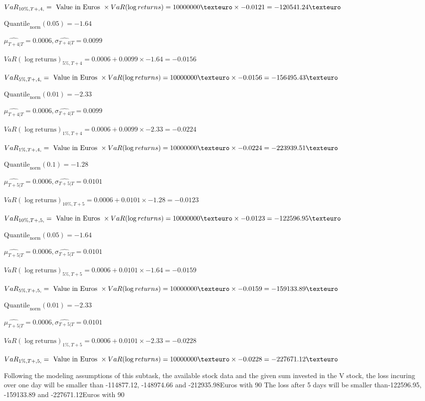 $VaR_{10\%, T + ,4,} = \text{ Value in Euros } \times VaR(\log returns) = 10 000 000 \texteuro \times-0.0121 = -120541.24 \texteuro$


$\text{Quantile}_\text{norm}(0.05) = -1.64$

$\hat{\mu_{T+4|T}} = 0.0006, \hat{\sigma_{T+4|T}} = 0.0099$

$VaR(\log \text{returns})_{5\%, T + 4} = 0.0006 + 0.0099\times-1.64 = -0.0156$

$VaR_{5\%, T + ,4,} = \text{ Value in Euros } \times VaR(\log returns) = 10 000 000 \texteuro \times-0.0156 = -156495.43 \texteuro$


$\text{Quantile}_\text{norm}(0.01) = -2.33$

$\hat{\mu_{T+4|T}} = 0.0006, \hat{\sigma_{T+4|T}} = 0.0099$

$VaR(\log \text{returns})_{1\%, T + 4} = 0.0006 + 0.0099\times-2.33 = -0.0224$

$VaR_{1\%, T + ,4,} = \text{ Value in Euros } \times VaR(\log returns) = 10 000 000 \texteuro \times-0.0224 = -223939.51 \texteuro$


$\text{Quantile}_\text{norm}(0.1) = -1.28$

$\hat{\mu_{T+5|T}} = 0.0006, \hat{\sigma_{T+5|T}} = 0.0101$

$VaR(\log \text{returns})_{10\%, T + 5} = 0.0006 + 0.0101\times-1.28 = -0.0123$

$VaR_{10\%, T + ,5,} = \text{ Value in Euros } \times VaR(\log returns) = 10 000 000 \texteuro \times-0.0123 = -122596.95 \texteuro$


$\text{Quantile}_\text{norm}(0.05) = -1.64$

$\hat{\mu_{T+5|T}} = 0.0006, \hat{\sigma_{T+5|T}} = 0.0101$

$VaR(\log \text{returns})_{5\%, T + 5} = 0.0006 + 0.0101\times-1.64 = -0.0159$

$VaR_{5\%, T + ,5,} = \text{ Value in Euros } \times VaR(\log returns) = 10 000 000 \texteuro \times-0.0159 = -159133.89 \texteuro$


$\text{Quantile}_\text{norm}(0.01) = -2.33$

$\hat{\mu_{T+5|T}} = 0.0006, \hat{\sigma_{T+5|T}} = 0.0101$

$VaR(\log \text{returns})_{1\%, T + 5} = 0.0006 + 0.0101\times-2.33 = -0.0228$

$VaR_{1\%, T + ,5,} = \text{ Value in Euros } \times VaR(\log returns) = 10 000 000 \texteuro \times-0.0228 = -227671.12 \texteuro$


Following the modeling assumptions of this subtask, the available stock data and the given sum invested in the V stock, the loss incuring over one day will be smaller than -114877.12, -148974.66 and -212935.98Euros with 90%
The loss after 5 days will be smaller than-122596.95, -159133.89 and -227671.12Euros with 90%



